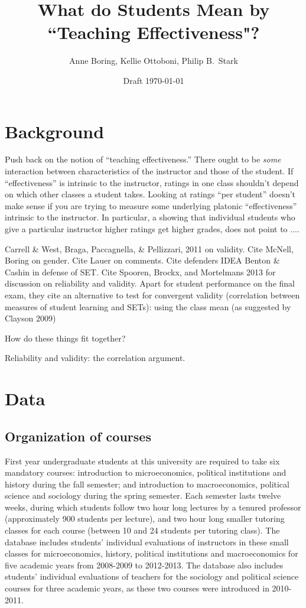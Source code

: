\documentclass[12pt]{article}
\title{What do Students Mean by ``Teaching Effectiveness"?}
\author{Anne Boring, Kellie Ottoboni, Philip B.~Stark}
\date{Draft \today}
\newcommand{\todo}[1]{{\color{red}{TO DO: \sc #1}}}
\begin{document}
\maketitle

\section{Background}
Push back on the notion of ``teaching effectiveness.''
There ought to be \emph{some} interaction between characteristics of the
instructor and those of the student.
If ``effectiveness'' is intrinsic to the instructor, ratings in one class shouldn't depend on
which other classes a student takes.
Looking at ratings ``per student'' doesn't make sense if you are trying to
measure some underlying platonic ``effectiveness'' intrinsic to the instructor.
In particular,  a showing that individual students who give a particular instructor higher ratings
get higher grades, does not point to ....\todo{fix me}

Carrell \& West, Braga, Paccagnella, \& Pellizzari, 2011 on validity.
Cite McNell, Boring on gender.
Cite Lauer on comments.
Cite defenders IDEA Benton \& Cashin in defense of SET.  
Cite Spooren, Brockx, and Mortelmans 2013 for discussion on reliability and validity. Apart for student performance on 
the final exam, they cite an alternative to test for convergent validity (correlation between measures of student learning 
and SETs): using the class mean (as suggested by Clayson 2009) 

How do these things fit together?

Reliability and validity: the correlation argument.

\section{Data}
\subsection{Organization of courses}

First year undergraduate students at this university are required to take six mandatory courses: introduction to 
microeconomics, political institutions and history during the fall semester; and introduction to macroeconomics, political 
science and sociology during the spring semester. Each semester lasts twelve weeks, during which 
students follow two hour long lectures by a tenured professor
(approximately 900 students per lecture), and two hour long smaller tutoring classes for each course 
(between 10 and 24 students per tutoring class). The database includes students' individual evaluations of instructors 
in these small classes for microeconomics, history, political institutions and macroeconomics for five academic years from 
2008-2009 to 2012-2013. The database also includes students' individual evaluations of teachers for the sociology and
political science courses for three academic years, as these two courses were introduced in 2010-2011.
\end{document}
